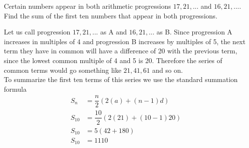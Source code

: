 
%
%
%
%
% 
% 

\question Certain numbers appear in both arithmetic progressions $17, 21, ...$ and $16, 21, ...$. Find the sum of the first ten numbers that appear in both progressions.

\insertQR{}

\ifprintanswers
\fi 

\begin{solution}
  Let us call progression $17, 21, ...$ as A and $16, 21, ...$ as B. Since progression A increases in multiples of 4 and progression B increases by multiples of 5, the next term  they have in common will have a difference of 20 with the previous term, since the lowest common multiple of 4 and 5 is 20. Therefore the series of common terms would go something like $21, 41, 61$ and so on. \\
  To summarize the first ten terms of this series we use the standard summation formula  
  \begin{align}
    S_{n}   &= \dfrac{n}{2}(2(a) + (n-1)d) \\
    S_{10} &= \dfrac{10}{2}(2(21) + (10-1)20) \\
    S_{10} &= 5(42+180) \\
    S_{10} &= 1110
  \end{align}  

\end{solution} 